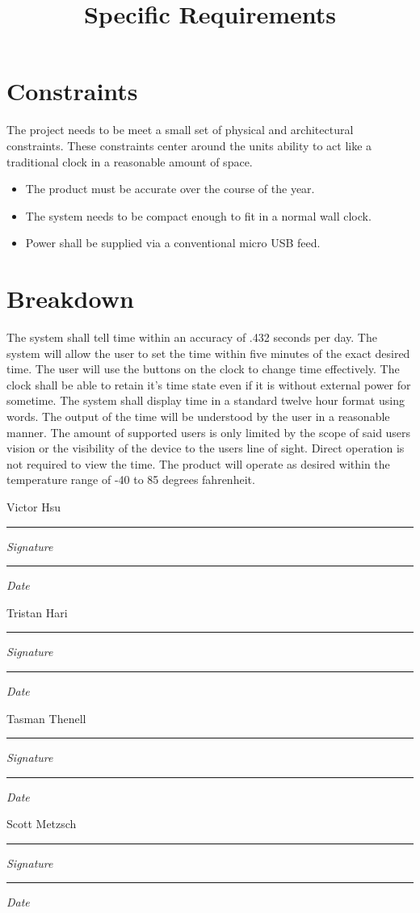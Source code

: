 \documentclass[10pt,draftclsnofoot,onecolumn]{IEEEtran}
\newcommand{\namesigdate}[2][7cm]{%
\begin{minipage}{#1}
    #2 \vspace{1.0cm}\hrule\smallskip
    \small \textit{Signature}
    \vspace{1.0cm}\hrule\smallskip
    \small \textit{Date}
\end{minipage}
}
\begin{document}
\section{Constraints}
The project needs to be meet a small set of physical and architectural constraints. These 
constraints center around the units ability to act like a traditional clock in a reasonable 
amount of space.
\begin{itemize}
	\item The product must be accurate over the course of the year.
	\item The system needs to be compact enough to fit in a normal wall clock. 
	\item Power shall be supplied via a conventional micro USB feed.
\end{itemize}

\newpage
\title{Specific Requirements}
\section{Breakdown}
The system shall tell time within an accuracy of .432 seconds per day. The system will allow 
the user to set the time within five minutes of the exact desired time. The user will use the 
buttons on the clock to change time effectively. The clock shall be able to retain it’s time 
state even if it is without external power for sometime. The system shall display time in a 
standard twelve hour format using words. The output of the time will be understood by the user 
in a reasonable manner. The amount of supported users is only limited by the scope of said 
users vision or the visibility of the device to the users line of sight. Direct operation is 
not required to view the time. The product will operate as desired within the temperature 
range of -40 to 85 degrees fahrenheit. 

\newpage

\noindent \namesigdate{Victor Hsu} \hfill \namesigdate{Tristan Hari} \par
\vspace{2cm}
\noindent \namesigdate{Tasman Thenell} \hfill \namesigdate{Scott Metzsch}
\end{document}
